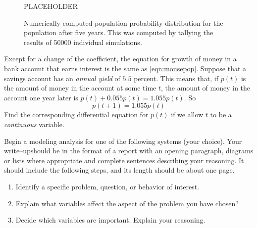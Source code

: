 \begin{figure}
\centerline{%
PLACEHOLDER
}
\caption{Numerically computed population
probability distribution for the population
after five years.  This was computed by
tallying the results of 50000 individual
simulations.}
\label{fig:StochDist}
\end{figure}
%
\newpage
%
\begin{exercises}
\begin{exercise}
Except for a change of the coefficient, the equation for
growth of money in a bank account that earns interest
is the same as \eqref{eqn:mousepop}.
Suppose that a savings account has an
\emph{annual yield} of $5.5$ percent.
This means that, if $p(t)$ is the amount of money in the
account at some time $t$, the amount of money in the account
one year later is $p(t) + 0.055p(t) = 1.055p(t)$.
So
\begin{equation}
     p(t+1) = 1.055p(t)
\end{equation}
Find the corresponding
differential equation
for $p(t)$ if we allow $t$ to be a \emph{continuous}
variable.
\end{exercise}

\begin{exercise}
Begin a modeling analysis for one of the following systems
(your choice).  
Your write--up\linebreak should be in the format of a report
with an opening paragraph, diagrams or lists where appropriate and
complete sentences describing your reasoning.  
It should include the following steps, and
its length should be about one page. 
\begin{enumerate}
\item Identify a specific problem, question, or behavior of interest.
\item Explain what variables affect the aspect of the problem you
have chosen?
\item Decide which variables are important.  Explain your reasoning.
\end{enumerate}

\end{exercise}
\end{exercises}
